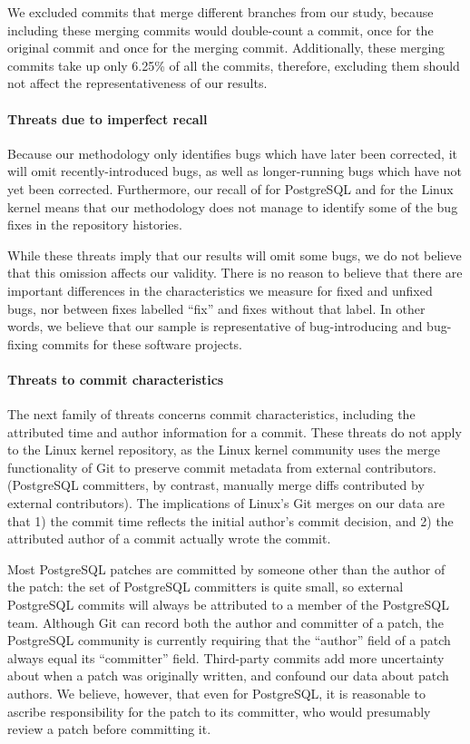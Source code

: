 We excluded commits that merge different branches from our study, because
including these merging commits would double-count a commit, once for the
original commit and once for the merging commit. Additionally, these merging
commits take up only 6.25\% of all the commits, therefore, excluding them should
not affect the representativeness of our results.

\paragraph{Threats due to imperfect recall}

Because our methodology only identifies bugs which have later been corrected, it
will omit recently-introduced bugs, as well as longer-running bugs
which have not yet been corrected. Furthermore, our recall of \postR for
PostgreSQL and \linuxR for the Linux kernel means that our methodology does not
manage to identify some of the bug fixes in the repository histories.

While these threats imply that our results will omit some bugs, we do not
believe that this omission affects our validity. There is no reason to believe
that there are important differences in the characteristics we measure for fixed
and unfixed bugs, nor between fixes labelled ``fix'' and fixes without that
label. In other words, we believe that our sample is representative of
bug-introducing and bug-fixing commits for these software projects.

\paragraph{Threats to commit characteristics}

The next family of threats concerns commit characteristics, including the
attributed time and author information for a commit. These threats do not apply
to the Linux kernel repository, as the Linux kernel community uses the merge
functionality of Git to preserve commit metadata from external
contributors. (PostgreSQL committers, by contrast, manually merge diffs
contributed by external contributors). The implications of Linux's Git merges
on our data are that 1) the commit time reflects the initial author's commit
decision, and 2) the attributed author of a commit actually wrote the commit.

Most PostgreSQL patches are committed by someone other than the author of the
patch: the set of PostgreSQL committers is quite small, so external PostgreSQL
commits will always be attributed to a member of the PostgreSQL team. Although
Git can record both the author and committer of a patch, the PostgreSQL
community is currently requiring that the ``author'' field of a patch always
equal its ``committer'' field. Third-party commits add more uncertainty about
when a patch was originally written, and confound our data about patch authors.
We believe, however, that even for PostgreSQL, it is reasonable to ascribe
responsibility for the patch to its committer, who would presumably review a
patch before committing it.

